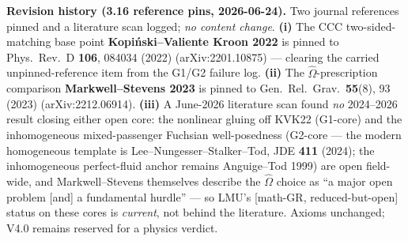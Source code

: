 \documentclass[11pt]{article}
\begin{document}
{\smallskip\noindent\textbf{Revision history (3.16 reference pins, 2026-06-24).} Two journal references pinned and a literature scan logged; \emph{no content change}. \textbf{(i)} The CCC two-sided-matching base point \textbf{Kopi\'nski--Valiente Kroon 2022} is pinned to Phys.\ Rev.\ D \textbf{106}, 084034 (2022) (arXiv:2201.10875) --- clearing the carried unpinned-reference item from the G1/G2 failure log. \textbf{(ii)} The $\hat\Omega$-prescription comparison \textbf{Markwell--Stevens 2023} is pinned to Gen.\ Rel.\ Grav.\ \textbf{55}(8), 93 (2023) (arXiv:2212.06914). \textbf{(iii)} A June-2026 literature scan found \emph{no} 2024--2026 result closing either open core: the nonlinear gluing off KVK22 (G1-core) and the inhomogeneous mixed-passenger Fuchsian well-posedness (G2-core --- the modern homogeneous template is Lee--Nungesser--Stalker--Tod, JDE \textbf{411} (2024); the inhomogeneous perfect-fluid anchor remains Anguige--Tod 1999) are open field-wide, and Markwell--Stevens themselves describe the $\hat\Omega$ choice as ``a major open problem [and] a fundamental hurdle'' --- so LMU's [math-GR, reduced-but-open] status on these cores is \emph{current}, not behind the literature. Axioms unchanged; V4.0 remains reserved for a physics verdict.

}
\end{document}
